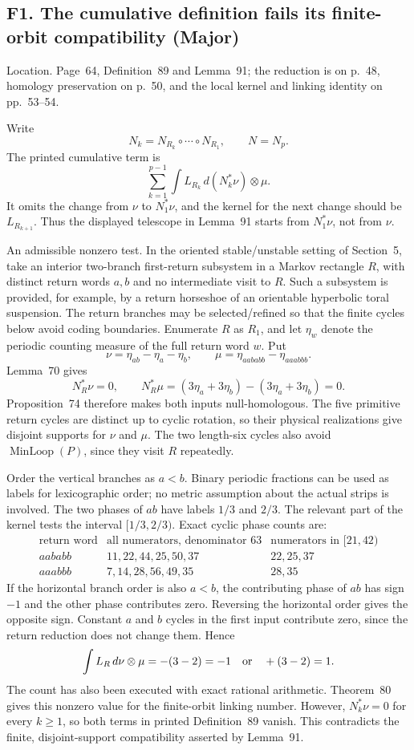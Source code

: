 \documentclass[10pt]{article}
\begin{document}
\subsection*{F1. The cumulative definition fails its finite-orbit compatibility (Major)}
Location. Page 64, Definition 89 and Lemma 91; the reduction is on p. 48, homology preservation on p. 50, and the local kernel and linking identity on pp. 53–54.\par
Write \[N_k=N_{R_k}\circ\cdots\circ N_{R_1},\qquad N=N_p.\] The printed cumulative term is \[\sum_{k=1}^{p-1}\int L_{R_k}\,d(N_k^*\nu)\otimes\mu.\] It omits the change from \(\nu\) to \(N_1^*\nu\), and the kernel for the next change should be \(L_{R_{k+1}}\). Thus the displayed telescope in Lemma 91 starts from \(N_1^*\nu\), not from \(\nu\).\par
An admissible nonzero test. In the oriented stable/unstable setting of Section 5, take an interior two-branch first-return subsystem in a Markov rectangle \(R\), with distinct return words \(a,b\) and no intermediate visit to \(R\). Such a subsystem is provided, for example, by a return horseshoe of an orientable hyperbolic toral suspension. The return branches may be selected/refined so that the finite cycles below avoid coding boundaries. Enumerate \(R\) as \(R_1\), and let \(\eta_w\) denote the periodic counting measure of the full return word \(w\). Put \[\nu=\eta_{ab}-\eta_a-\eta_b,\qquad
 \mu=\eta_{aababb}-\eta_{aaabbb}.\] Lemma 70 gives \[N_R^*\nu=0,\qquad
 N_R^*\mu=(3\eta_a+3\eta_b)-(3\eta_a+3\eta_b)=0.\] Proposition 74 therefore makes both inputs null-homologous. The five primitive return cycles are distinct up to cyclic rotation, so their physical realizations give disjoint supports for \(\nu\) and \(\mu\). The two length-six cycles also avoid \(\operatorname{MinLoop}(P)\), since they visit \(R\) repeatedly.\par
Order the vertical branches as \(a<b\). Binary periodic fractions can be used as labels for lexicographic order; no metric assumption about the actual strips is involved. The two phases of \(ab\) have labels \(1/3\) and \(2/3\). The relevant part of the kernel tests the interval \([1/3,2/3)\). Exact cyclic phase counts are: \[\begin{array}{c|c|c}
\text{return word}&\text{all numerators, denominator }63&
 \text{numerators in }[21,42)\\ \hline
aababb&11,22,44,25,50,37&22,25,37\\
aaabbb&7,14,28,56,49,35&28,35
\end{array}\] If the horizontal branch order is also \(a<b\), the contributing phase of \(ab\) has sign \(-1\) and the other phase contributes zero. Reversing the horizontal order gives the opposite sign. Constant \(a\) and \(b\) cycles in the first input contribute zero, since the return reduction does not change them. Hence \[\int L_R\,d\nu\otimes\mu=-(3-2)=-1
 \quad\hbox{or}\quad +(3-2)=1.\] The count has also been executed with exact rational arithmetic. Theorem 80 gives this nonzero value for the finite-orbit linking number. However, \(N_k^*\nu=0\) for every \(k\ge1\), so both terms in printed Definition 89 vanish. This contradicts the finite, disjoint-support compatibility asserted by Lemma 91.\par
\end{document}
